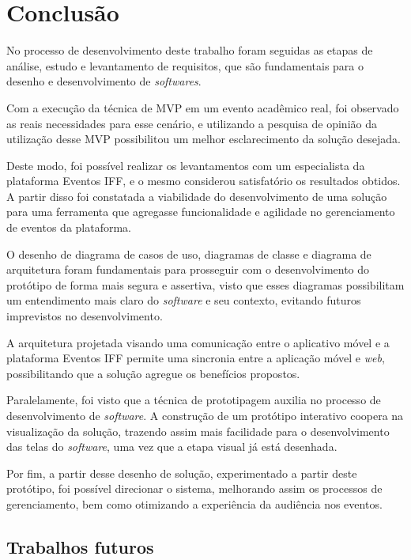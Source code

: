 \chapter{Conclusão}

No processo de desenvolvimento deste trabalho foram seguidas as etapas de análise, estudo e levantamento de requisitos, que são fundamentais para o desenho e desenvolvimento de \textit{softwares}.

Com a execução da técnica de MVP em um evento acadêmico real, foi observado as reais necessidades para esse cenário, e utilizando a pesquisa de opinião da utilização desse MVP possibilitou um melhor esclarecimento da solução desejada.

Deste modo, foi possível realizar os levantamentos com um especialista da plataforma Eventos IFF, e o mesmo considerou satisfatório os resultados obtidos. A partir disso foi constatada a viabilidade do desenvolvimento de uma solução para uma ferramenta que agregasse funcionalidade e agilidade no gerenciamento de eventos da plataforma.

O desenho de diagrama de casos de uso, diagramas de classe e diagrama de arquitetura foram fundamentais para prosseguir com o desenvolvimento do protótipo de forma mais segura e assertiva, visto que esses diagramas possibilitam um entendimento mais claro do \textit{software} e seu contexto, evitando futuros imprevistos no desenvolvimento.

A arquitetura projetada visando uma comunicação entre o aplicativo móvel e a plataforma Eventos IFF permite uma sincronia entre a aplicação móvel e \textit{web}, possibilitando que a solução agregue os benefícios propostos. 

Paralelamente, foi visto que a técnica de prototipagem auxilia no processo de desenvolvimento de \textit{software}. A construção de um protótipo interativo coopera na visualização da solução, trazendo assim mais facilidade para o desenvolvimento das telas do \textit{software}, uma vez que a etapa visual já está desenhada. 

Por fim, a partir desse desenho de solução, experimentado a partir deste protótipo, foi possível direcionar o sistema, melhorando assim os processos de gerenciamento, bem como otimizando a experiência da audiência nos eventos.

\section{Trabalhos futuros}

